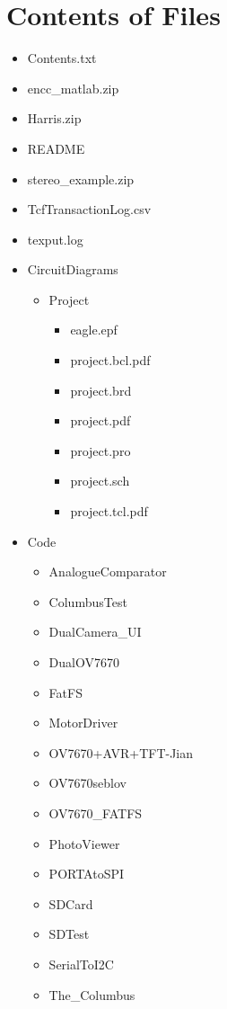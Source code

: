 \chapter{Contents of Files} \label{Appendix:Contents}
\begin{itemize}
\item Contents.txt
\item encc\_matlab.zip
\item Harris.zip
\item README
\item stereo\_example.zip
\item TcfTransactionLog.csv
\item texput.log
\item CircuitDiagrams
\begin{itemize}
\item Project
\begin{itemize}
\item eagle.epf
\item project.bcl.pdf
\item project.brd
\item project.pdf
\item project.pro
\item project.sch
\item project.tcl.pdf
\end{itemize}
\end{itemize}
\item Code
\begin{itemize}
\item AnalogueComparator
\item ColumbusTest
\item DualCamera\_UI
\item DualOV7670
\item FatFS
\item MotorDriver
\item OV7670+AVR+TFT-Jian
\item OV7670seblov
\item OV7670\_FATFS
\item PhotoViewer
\item PORTAtoSPI
\item SDCard
\item SDTest
\item SerialToI2C
\item The\_Columbus
\end{itemize}

\end{itemize}

